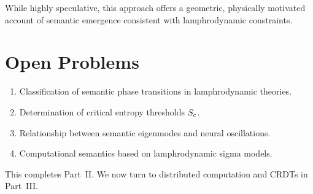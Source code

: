 \begin{remark}
While highly speculative, this approach offers a geometric, physically
motivated account of semantic emergence consistent with
lamphrodynamic constraints.
\end{remark}


\section{Open Problems}

\begin{enumerate}
\item Classification of semantic phase transitions in lamphrodynamic
theories.
\item Determination of critical entropy thresholds $S_c$.
\item Relationship between semantic eigenmodes and neural oscillations.
\item Computational semantics based on lamphrodynamic sigma models.
\end{enumerate}

\medskip
\noindent
This completes Part~II. We now turn to distributed computation and
CRDTs in Part~III.
\newpage

